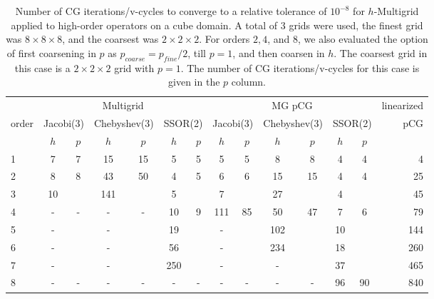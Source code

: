\begin{table}
  \caption{\label{tab:box3} Number of CG iterations/v-cycles to converge to a relative tolerance of $10^{-8}$ for $h$-Multigrid applied to high-order operators on a cube domain. A total of 3 grids were used, the finest grid was $8\times 8\times 8$, and the coarsest was $2\times 2\times 2$. For orders $2,4$, and $8$, we also evaluated the option of first coarsening in $p$ as $p_{coarse} = p_{fine}/2$, till $p=1$, and then coarsen in $h$. The coarsest grid in this case is a $2\times 2\times 2$ grid with $p=1$. The number of CG iterations/v-cycles for this case is given in the $p$ column.}
		\centering
    \begin{tabular}{|l|c|c|c|c|c|c|c|c|c|c|c|c|r|} 
	    \hline
						        & \multicolumn{6}{c|}{Multigrid} & \multicolumn{6}{c|}{MG pCG} &          linearized \\
																 \cline{2-13}
									order &  \multicolumn{2}{c|}{\scriptsize  Jacobi(3)} &  \multicolumn{2}{c|}{\scriptsize Chebyshev(3)} & \multicolumn{2}{c|}{\scriptsize  SSOR(2)} & \multicolumn{2}{c|}{\scriptsize Jacobi(3)} &  \multicolumn{2}{c|}{\scriptsize Chebyshev(3)} & \multicolumn{2}{c|}{\scriptsize SSOR(2)} & pCG\\
						\hline
						 & $h$ & $p$ & $h$ & $p$& $h$ & $p$& $h$ & $p$& $h$ & $p$& $h$ & $p$& \\
						 \cline{2-13}
						 
1 & 7  &  7  & 15  & 15  &  5   &  5   & 5    &  5   &  8   &   8    & 4   &  4   & 4    \\
2 & 8  &  8  & 43  & 50  &  4   &  5   & 6    &  6   &  15  &  15    & 4   &  4   & 25   \\
3 & 10 &     & 141 &     &  5   &      & 7    &      &  27  &        & 4   &      & 45   \\
4 & -  &  -  & -   &  -  &  10  &  9   & 111  &  85  &  50  &  47    & 7   &  6   & 79   \\
5 & -  &     & -   &     &  19  &      & -    &      &  102 &        & 10  &      & 144  \\
6 & -  &     & -   &     &  56  &      & -    &      &  234 &        & 18  &      & 260  \\
7 & -  &     & -   &     &  250 &      & -    &      &  -   &        & 37  &      & 465  \\	
8 & -  &  -  & -   &  -  &  -   &  -   & -    &   -  &  -   &   -    & 96  & 90   & 840  \\
			\hline
	  \end{tabular}
\end{table}

